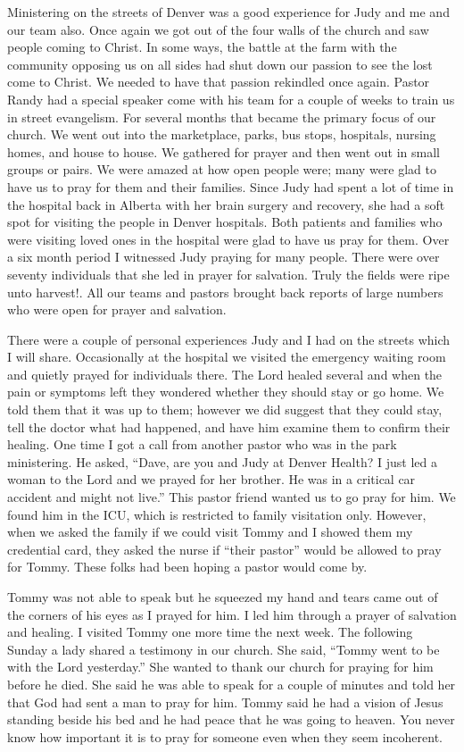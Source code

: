 \documentclass[twoside, 12pt]{book}
\begin{document}
Ministering on the streets of Denver was a good experience for Judy and me and our team also. Once again we got out of the four walls of the church and saw people coming to Christ. In some ways, the battle at the farm with the community opposing us on all sides had shut down our passion to see the lost come to Christ. We needed to have that passion rekindled once again. Pastor Randy had a special speaker come with his team for a couple of weeks to train us in street evangelism. For several months that became the primary focus of our church. We went out into the marketplace, parks, bus stops, hospitals, nursing homes, and house to house. We gathered for prayer and then went out in small groups or pairs. We were amazed at how open people were; many were glad to have us to pray for them and their families. Since Judy had spent a lot of time in the hospital back in Alberta with her brain surgery and recovery, she had a soft spot for visiting the people in Denver hospitals. Both patients and families who were visiting loved ones in the hospital were glad to have us pray for them. Over a six month period I witnessed Judy praying for many people. There were over seventy individuals that she led in prayer for salvation. Truly the fields were ripe unto harvest!. All our teams and pastors brought back reports of large numbers who were open for prayer and salvation. 

There were a couple of personal experiences Judy and I had on the streets which I will share. Occasionally at the hospital we visited the emergency waiting room and quietly prayed for individuals there. The Lord healed several and when the pain or symptoms left they wondered whether they should stay or go home. We told them that it was up to them; however we did  suggest that they could stay, tell the doctor what had happened, and have him examine them to confirm their healing. One time I got a call from another pastor who was in the park ministering. He asked, “Dave, are you and Judy at Denver Health? I just led a woman to the Lord and we prayed for her brother. He was in a critical car accident and might not live.” This pastor friend wanted us to go pray for him. We found him in the ICU, which is restricted to family visitation only. However, when we asked the family if we could visit Tommy and I showed them my credential card, they asked the nurse if “their pastor” would be allowed to pray for Tommy. These folks had been hoping a pastor would come by. 

Tommy was not able to speak but he squeezed my hand and tears came out of the corners of his eyes as I prayed for him. I led him through a prayer of salvation and healing. I visited Tommy one more time the next week. The following Sunday a lady shared a testimony in our church. She said, “Tommy went to be with the Lord yesterday.” She wanted to thank our church for praying for him before he died. She said he was able to speak for a couple of minutes and told her that God had sent a man to pray for him. Tommy said he had a vision of Jesus standing beside his bed and he had peace that he was going to heaven. You never know how important it is to pray for someone even when they seem incoherent. 
\end{document}
